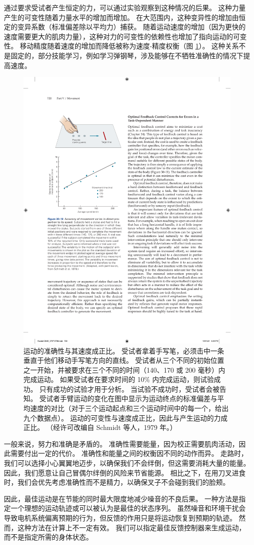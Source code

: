 通过要求受试者产生恒定的力，可以通过实验观察到这种情况的后果。 这种力量产生的可变性随着力量水平的增加而增加。 在大范围内，这种变异性的增加由恒定的变异系数（标准偏差除以平均力）捕获。 
随着运动速度的增加（因为更快的速度需要更大的肌肉力量），这种对力的可变性的依赖性也增加了指向运动的可变性。 移动精度随着速度的增加而降低被称为速度-精度权衡（图 \ref{fig:30_10}）。 
这种关系不是固定的，部分技能学习，例如学习弹钢琴，涉及能够在不牺牲准确性的情况下提高速度。

\begin{figure}[htbp]
	\centering
	\includegraphics[width=0.5\linewidth]{chap30/fig_30_10}
	\caption{运动的准确性与其速度成正比。 受试者拿着手写笔，必须击中一条垂直于他们移动手写笔方向的直线。 受试者从三个不同的初始位置之一开始，并被要求在三个不同的时间（140、170 或 200 毫秒）内完成运动。 如果受试者在要求时间的 10\% 内完成运动，则试验成功。 只有成功的试验才用于分析。 当试验不成功时，受试者会被告知。 受试者手臂运动的变化在图中显示为运动终点的标准偏差与平均速度的对比（对于三个运动起点和三个运动时间中的每一个，给出九个数据点）。 运动的可变性与速度成正比，因此与产生运动的力成正比。 （经许可改编自 Schmidt 等人，1979 年。）}
	\label{fig:30_10}
\end{figure}

一般来说，努力和准确是矛盾的。 准确性需要能量，因为校正需要肌肉活动，因此需要付出一定的代价。 准确性和能量之间的权衡因不同的动作而异。 走路时，我们可以选择小心翼翼地迈步，以确保我们不会绊倒，但这需要消耗大量的能量。 因此，我们愿意让自己冒偶尔绊倒的风险来节省能源。 相比之下，在用刀叉进食时，我们会优先考虑准确性而不是精力，以确保叉子不会碰到我们的脸颊。

因此，最佳运动是在节能的同时最大限度地减少噪音的不良后果。 一种方法是指定一个理想的运动轨迹或可以被认为是最佳的状态序列。 虽然噪音和环境干扰会导致电机系统偏离预期的行为，但反馈的作用只是将运动恢复到预期的轨迹。 然而，这种方法在计算上不一定有效。 我们可以指定最佳反馈控制器来生成运动，而不是指定所需的身体状态。


